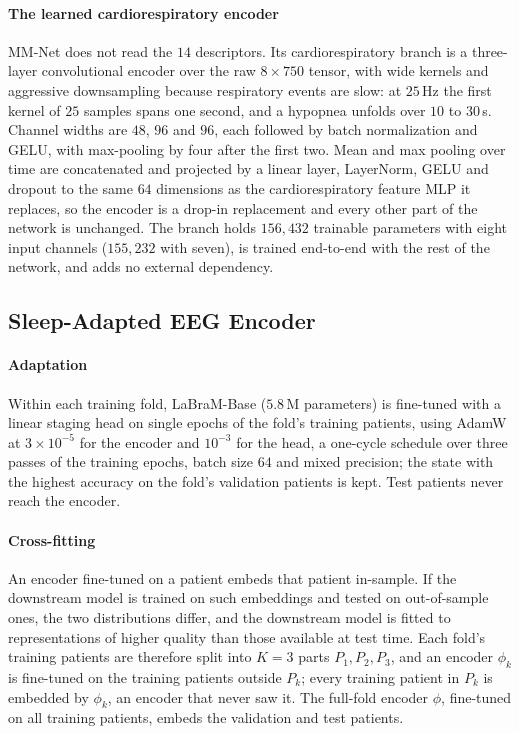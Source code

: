 \documentclass[a4paper,fleqn]{cas-sc}
\begin{document}
\paragraph{The learned cardiorespiratory encoder}
MM-Net does not read the $14$ descriptors. Its cardiorespiratory branch is a three-layer convolutional encoder over the raw $8\times750$ tensor, with wide kernels and aggressive downsampling because respiratory events are slow: at $25$\,Hz the first kernel of $25$ samples spans one second, and a hypopnea unfolds over $10$ to $30$\,s. Channel widths are
$48$, $96$ and $96$, each followed by batch normalization and GELU, with max-pooling by four
after the first two. Mean and max pooling over time are concatenated and projected by a
linear layer, LayerNorm, GELU and dropout to the same
$64$ dimensions as the cardiorespiratory feature MLP it replaces, so the encoder is a drop-in replacement and every
other part of the network is unchanged. The branch holds $156{,}432$ trainable parameters
with eight input channels ($155{,}232$ with seven), is trained end-to-end with the rest of the
network, and adds no external dependency.

\subsection{Sleep-Adapted EEG Encoder}
\label{sec:encoder}
\paragraph{Adaptation} Within each training fold, LaBraM-Base ($5.8$\,M parameters) is
fine-tuned with a linear staging head on single epochs of the fold's training patients, using
AdamW at $3\times10^{-5}$ for the encoder and $10^{-3}$ for the head, a one-cycle schedule
over three passes of the training epochs, batch size $64$ and mixed precision; the state with
the highest accuracy on the fold's validation patients is kept. Test patients never reach the
encoder.

\paragraph{Cross-fitting} An encoder fine-tuned on a patient embeds that patient in-sample. If the downstream model is trained on such embeddings and tested on out-of-sample ones, the two distributions differ, and the downstream model is fitted to representations of higher quality than those available at test time. Each fold's training patients are therefore split
into $K=3$ parts $P_1,P_2,P_3$, and an encoder $\phi_k$ is fine-tuned on the training patients
outside $P_k$; every training patient in $P_k$ is embedded by $\phi_k$, an encoder that never
saw it. The full-fold encoder $\phi$, fine-tuned on all training patients, embeds the
validation and test patients.
\end{document}
